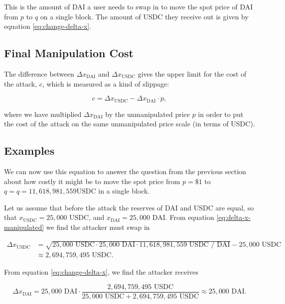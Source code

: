 \documentclass[a4paper, 11pt]{article}
\begin{document}
This is the amount of DAI a user needs to swap in to move the spot price of DAI from $p$ to $q$ on a single block. The amount of USDC they receive out is given by equation \eqref{eq:change-delta-x}. 

\subsection{Final Manipulation Cost}

The difference between $\Delta x_{\text{DAI}}$ and $\Delta x_{\text{USDC}}$ gives the upper limit for the cost of the attack, $c$, which is measured as a kind of slippage:

\begin{equation}
\label{eq:cost}
c
=
\Delta x_{\text{USDC}}
-
\Delta x_{\text{DAI}} \cdot p,
\end{equation} 

where we have multiplied $\Delta x_{\text{DAI}}$ by the unmanipulated price $p$ in order to put the cost of the attack on the same unmanipulated price scale (in terms of USDC). 

\subsection{Examples}

We can now use this equation to answer the question from the previous section about how costly it might be to move the spot price from $p = \$1$ to $q = q = 11,618,981,559 \text{USDC}$ in a single block. 

Let us assume that before the attack the reserves of DAI and USDC are equal, so that $x_{\text{USDC}} = 25,000 \text{ USDC}$, and $x_{\text{DAI}} = 25,000 \text{ DAI}$. From equation \eqref{eq:delta-x-manipulated} we find the attacker must swap in 

\begin{align}
\Delta x_{\text{USDC}} 
&=
\sqrt{25,000 \text{ USDC} \cdot 25,000 \text{ DAI} \cdot 11,618,981,559 \text{ USDC } /\text{ DAI}} - 25,000 \text{ USDC} \\ \nonumber
&\approx
2,694,759,495 \text{ USDC}.
\end{align}

From equation \eqref{eq:change-delta-x}, we find the attacker receives 

\begin{equation}
\Delta x_{\text{DAI}}
=
25,000 \text{ DAI} \cdot \frac{2,694,759,495 \text{ USDC}}{25,000 \text{ USDC} + 2,694,759,495 \text{ USDC}}
\approx
25,000 \text{ DAI}.
\end{equation}
\end{document}

